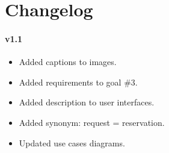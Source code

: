 \chapter*{Changelog}
\subsubsection{v1.1}
\begin{itemize}
\item Added captions to images.
\item Added requirements to goal \#3.
\item Added description to user interfaces.
\item Added synonym: request = reservation.
\item Updated use cases diagrams.
\end{itemize}

